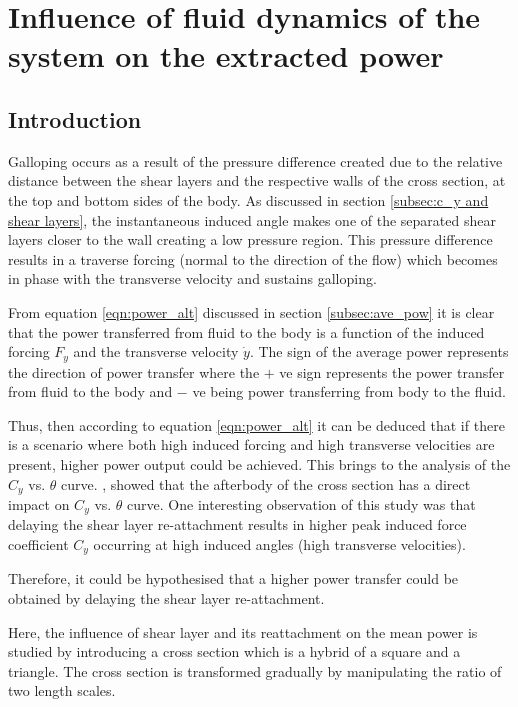 \chapter{Influence of fluid dynamics of the system on the extracted power}

\section{Introduction}

Galloping occurs as a result of the pressure difference created due to the relative distance between the shear layers and the respective walls of the cross section, at the top and bottom sides of the body. As discussed in section \ref{subsec:c_y and shear layers}, the instantaneous induced angle makes one of the separated shear layers closer to the wall creating a low pressure region. This pressure difference results in a traverse forcing (normal to the direction of the flow) which becomes in phase with the transverse velocity and sustains galloping. 

From equation \ref{eqn:power_alt} discussed in section \ref{subsec:ave_pow} it is clear that the power transferred from fluid to the body is a function of the induced forcing $F_y$ and the transverse velocity $\dot{y}$. The sign of the average power represents the direction of power transfer where the $+$ ve sign represents the power transfer from fluid to the body and $-$ ve being power transferring from body to the fluid. 

Thus, then  according to equation \ref{eqn:power_alt} it can be deduced that if there is a scenario where both high induced forcing and high transverse velocities are present, higher power output could be achieved. This brings to the analysis of the $C_y$ vs. $\theta$ curve. \citet{Luo1994}, showed that the afterbody of the cross section has a direct impact on $C_y$ vs. $\theta$ curve. One interesting observation of this study was that delaying the shear layer re-attachment results in higher peak induced force coefficient $C_y$ occurring at high induced angles (high transverse velocities).    

Therefore, it could be hypothesised that a higher power transfer could be obtained by delaying the shear layer re-attachment. 

Here, the influence of shear layer and its reattachment on the mean power is studied by introducing a cross section which is a hybrid of a square and a triangle. The cross section is transformed gradually by manipulating the ratio of two length scales.


